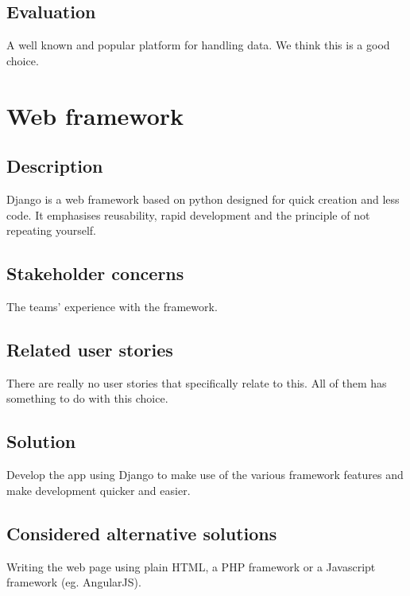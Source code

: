 \documentclass[12pt, a4paper]{article}
\begin{document}
\subsection{Evaluation}
A well known and popular platform for handling data. We think this is a good choice.

\newpage
\section{Web framework} %
\subsection{Description}
Django is a web framework based on python designed for quick creation and less code. It emphasises reusability, rapid development and the principle of not repeating yourself.
\subsection{Stakeholder concerns}
The teams' experience with the framework.
\subsection{Related user stories}
There are really no user stories that specifically relate to this. All of them has something to do with this choice.
\subsection{Solution}
Develop the app using Django to make use of the various framework features and make development quicker and easier.
\subsection{Considered alternative solutions}
Writing the web page using plain HTML, a PHP framework or a Javascript framework (eg. AngularJS).
\end{document}
